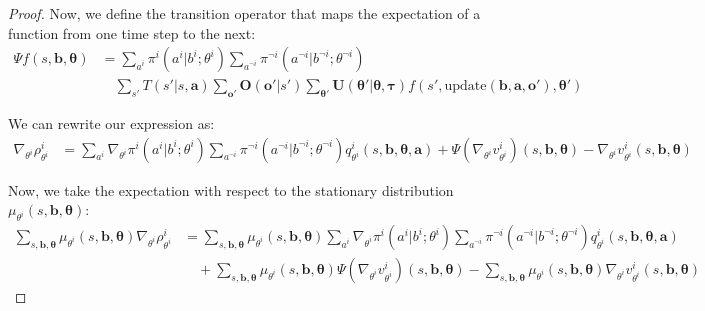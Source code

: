 \begin{proof}
    Now, we define the transition operator that maps the expectation of a function
    from one time step to the next:
    \begin{align}
        \Psi f(s, \boldsymbol{b}, \boldsymbol{\theta}) & = \sum_{a^i}\pi^{i}(a^{i}|b^{i}; \theta^{i}) \sum_{a^{\neg i}}\pi^{\neg i}(a^{\neg i}|b^{\neg i}; \theta^{\neg i})                                                                                                                                                                                 \\
                                                       & \quad \sum_{s'}T(s'|s, \boldsymbol{a}) \sum_{\boldsymbol{o}'}\boldsymbol{O}(\boldsymbol{o}'|s') \sum_{\boldsymbol{\theta}'}\boldsymbol{U}(\boldsymbol{\theta}'|\boldsymbol{\theta}, \boldsymbol{\tau}) f(s', \text{update}(\boldsymbol{b}, \boldsymbol{a}, \boldsymbol{o}'), \boldsymbol{\theta}')
    \end{align}

    We can rewrite our expression as:
    \begin{align}
        \nabla_{\theta^i}\rho^{i}_{\theta^i} & = \sum_{a^i}\nabla_{\theta^i}\pi^{i}(a^{i}|b^{i}; \theta^{i}) \sum_{a^{\neg i}}\pi^{\neg i}(a^{\neg i}|b^{\neg i}; \theta^{\neg i}) q^{i}_{\theta^i}(s, \boldsymbol{b}, \boldsymbol{\theta}, \boldsymbol{a}) + \Psi(\nabla_{\theta^i}v^{i}_{\theta^i})(s, \boldsymbol{b}, \boldsymbol{\theta}) - \nabla_{\theta^i}v^{i}_{\theta^i}(s, \boldsymbol{b}, \boldsymbol{\theta})
    \end{align}

    Now, we take the expectation with respect to the stationary distribution
    $\mu_{\theta^i}(s, \boldsymbol{b}, \boldsymbol{\theta})$:
    \begin{align}
        \sum_{s, \boldsymbol{b}, \boldsymbol{\theta}}\mu_{\theta^i}(s, \boldsymbol{b}, \boldsymbol{\theta}) \nabla_{\theta^i}\rho^{i}_{\theta^i} & = \sum_{s, \boldsymbol{b}, \boldsymbol{\theta}}\mu_{\theta^i}(s, \boldsymbol{b}, \boldsymbol{\theta}) \sum_{a^i}\nabla_{\theta^i}\pi^{i}(a^{i}|b^{i}; \theta^{i}) \sum_{a^{\neg i}}\pi^{\neg i}(a^{\neg i}|b^{\neg i}; \theta^{\neg i}) q^{i}_{\theta^i}(s, \boldsymbol{b}, \boldsymbol{\theta}, \boldsymbol{a})                                                            \\
                                                                                                                                                 & \quad + \sum_{s, \boldsymbol{b}, \boldsymbol{\theta}}\mu_{\theta^i}(s, \boldsymbol{b}, \boldsymbol{\theta}) \Psi(\nabla_{\theta^i}v^{i}_{\theta^i})(s, \boldsymbol{b}, \boldsymbol{\theta}) - \sum_{s, \boldsymbol{b}, \boldsymbol{\theta}}\mu_{\theta^i}(s, \boldsymbol{b}, \boldsymbol{\theta}) \nabla_{\theta^i}v^{i}_{\theta^i}(s, \boldsymbol{b}, \boldsymbol{\theta})
    \end{align}


\end{proof}
